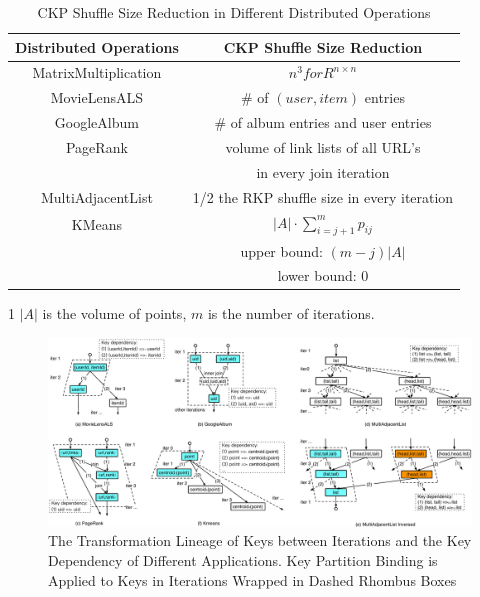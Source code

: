 \documentclass[10pt,journal,compsoc]{IEEEtran}
\begin{document}
\begin{table}[!t]
\begin{threeparttable}[b]
\renewcommand{\arraystretch}{1}
\caption{CKP Shuffle Size Reduction in Different Distributed Operations}\label{table:reduction}
\centering
\begin{tabularx}{0.5\textwidth}{ c || c }
\hline
\textbf{Distributed Operations} & \textbf{CKP Shuffle Size Reduction}  \\
\hline
MatrixMultiplication & $n^3 for R^{n \times n}$\\
\hline
MovieLensALS  & \# of $(user,item)$ entries  \\%
\hline
GoogleAlbum & \# of album entries and user entries \\
\hline
PageRank & volume of link lists of all URL's \\
& in every join iteration\\
\hline
MultiAdjacentList  & 1/2 the RKP shuffle size in every iteration \\
\hline
KMeans & $|A| \cdot \sum_{i=j+1}^{m} p_{ij}$ \tnote{1} \\
& upper bound: $(m-j) |A|$ \\
& lower bound: $0$\\
\hline
\end{tabularx}
\begin{tablenotes}
    \item[1] $|A|$ is the volume of points, $m$ is the number of iterations. 
  \end{tablenotes}
\end{threeparttable}
\end{table}

\begin{figure}[!t]
\centering
\includegraphics[width=2\columnwidth]{figure4}
\caption{The Transformation Lineage of Keys between Iterations 
and the Key Dependency of Different Applications. Key Partition Binding is Applied to Keys in Iterations Wrapped in Dashed Rhombus Boxes
}
\label{fig:application}
\end{figure}
\end{document}
